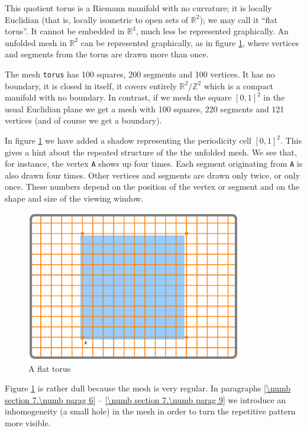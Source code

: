 This quotient torus is a Riemann manifold with no curvature; it is locally Euclidian
(that is, locally isometric to open sets of $ \mathbb{R}^2 $); we may call it ``flat torus''.
It cannot be embedded in $ \mathbb{R}^3 $, much less be represented graphically.
An unfolded mesh in $ \mathbb{R}^2 $ can be represented graphically,
as in figure \ref{\numb section 7.\numb fig 1}, where vertices and segments from the torus
are drawn more than once.

The mesh {\small\tt torus} has 100 squares, 200 segments and 100 vertices.
It has no boundary, it is closed in itself, it covers entirely $ \mathbb{R}^2/{\mathbb Z}^2 $
which is a compact manifold with no boundary.
In contrast, if we mesh the square $ [0,1]^2 $ in the usual Euclidian plane
we get a mesh with 100 squares, 220 segments and 121 vertices (and of course we get a boundary).

In figure \ref{\numb section 7.\numb fig 1} we have added a shadow representing
the periodicity cell $ [0,1]^2 $.
This gives a hint about the repeated structure of the the unfolded mesh.
We see that, for instance, the vertex {\small\tt A} shows up four times.
Each segment originating from {\small\tt A} is also drawn four times.
Other vertices and segments are drawn only twice, or only once.
These numbers depend on the position of the vertex or segment and on the shape and size
of the viewing window.

\begin{figure}[ht] \centering
  \includegraphics[width=94mm]{flat-torus-1.eps}
  \caption{A flat torus}
  \label{\numb section 7.\numb fig 1}
\end{figure}

Figure \ref{\numb section 7.\numb fig 1} is rather dull because the mesh is very regular.
In paragraphs \ref{\numb section 7.\numb parag 6} -- \ref{\numb section 7.\numb parag 9}
we introduce an inhomogeneity (a small hole) in the mesh in order to turn the repetitive pattern
more visible.

